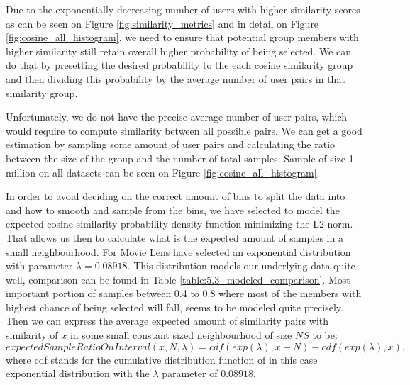 Due to the exponentially decreasing number of users with higher similarity scores as can be seen on Figure \ref{fig:similarity_metrics} and in detail on Figure \ref{fig:cosine_all_histogram}, we need to ensure that potential group members with higher similarity still retain overall higher probability of being selected. We can do that by presetting the desired probability to the each cosine similarity group and then dividing this probability by the average number of user pairs in that similarity group.

Unfortunately, we do not have the precise average number of user pairs, which would require to compute similarity between all possible pairs. We can get a good estimation by sampling some amount of user pairs and calculating the ratio between the size of the group and the number of total samples. Sample of size 1 million on all datasets can be seen on Figure \ref{fig:cosine_all_histogram}.


In order to avoid deciding on the correct amount of bins to split the data into and how to smooth and sample from the bins, we have selected to model the expected cosine similarity probability density function minimizing the L2 norm. That allows us then to calculate what is the expected amount of samples in a small neighbourhood. For Movie Lens have selected an exponential distribution with parameter $\lambda=0.08918$. This distribution models our underlying data quite well, comparison can be found in Table \ref{table:5.3_modeled_comparison}. Most important portion of samples between 0.4 to 0.8 where most of the members with highest chance of being selected will fall, seems to be modeled quite precisely.
Then we can express the average expected amount of similarity pairs with similarity of $x$ in some small constant sized neighbourhood of size $NS$ to be:
\begin{equation}
    expectedSampleRatioOnInterval(x, N, \lambda) = cdf(exp(\lambda), x + N) - cdf(exp(\lambda), x),
\end{equation}
where cdf stands for the cumulative distribution function of in this case exponential distribution with the $\lambda$ parameter of $0.08918$.

